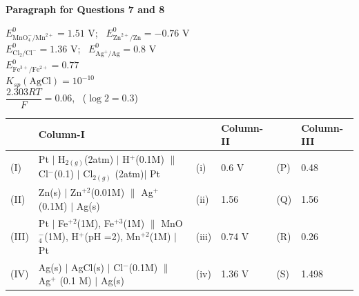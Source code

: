 \documentclass[10pt]{extarticle}
\newcommand{\paraq}[2]{\par\smallskip\noindent\textbf{Paragraph for Questions #1 and #2}\par}
\begin{document}
\noindent\begin{minipage}{\textwidth}
\paraq{7}{8}
$E^0_{\text{MnO}_4^-/\text{Mn}^{2+}}=1.51$ V; \ $E^0_{\text{Zn}^{2+}/\text{Zn}}=-0.76$ V\\
$E^0_{\text{Cl}_2/\text{Cl}^-}=1.36$ V; \ $E^0_{\text{Ag}^+/\text{Ag}}=0.8$ V\\
$E^0_{\text{Fe}^{3+}/\text{Fe}^{2+}}=0.77$\\
$K_{sp}(\text{AgCl})=10^{-10}$\\
$\dfrac{2.303RT}{F}=0.06$, \ ($\log2=0.3$)
\begin{center}\small
\begin{tabular}{|p{0.9cm}|p{8.8cm}|p{0.9cm}|p{1.8cm}|p{0.9cm}|p{1.8cm}|}
\hline
 & \centering Column-I & & \centering Column-II & & \centering Column-III\tabularnewline
\hline
(I) & Pt $|$ H$_{2(g)}$(2atm) $|$ H$^+$(0.1M) $\|$ Cl$^-$(0.1) $|$ Cl$_{2(g)}$ (2atm)$|$ Pt & (i) & 0.6 V & (P) & 0.48\\
(II) & Zn(s) $|$ Zn$^{+2}$(0.01M) $\|$ Ag$^+$(0.1M) $|$ Ag(s) & (ii) & 1.56 & (Q) & 1.56\\
(III) & Pt $|$ Fe$^{+2}$(1M), Fe$^{+3}$(1M) $\|$ MnO$_4^-$(1M), H$^+$(pH =2), Mn$^{+2}$(1M) $|$ Pt & (iii) & 0.74 V & (R) & 0.26\\
(IV) & Ag(s) $|$ AgCl(s) $|$ Cl$^-$(0.1M) $\|$ Ag$^+$ (0.1 M) $|$ Ag(s) & (iv) & 1.36 V & (S) & 1.498\\
\hline
\end{tabular}
\end{center}
\end{minipage}
\end{document}
